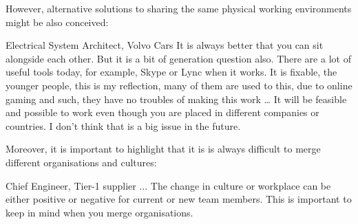 However, alternative solutions to sharing the same physical working environments might be also conceived:

\begin{aquote}{Electrical System Architect, Volvo Cars}
It is always better that you can sit alongside each other. But it is a bit of generation question also. There are a lot of useful tools today, for example, Skype or Lync when it works. It is fixable, the younger people, this is my reflection, many of them are used to this, due to online gaming and such, they have no troubles of making this work … It will be feasible and possible to work even though you are placed in different companies or countries. I don't think that is a big issue in the future.
\end{aquote}

Moreover, it is important to highlight that it is is always difficult to merge different organisations and cultures:

\begin{aquote}{Chief Engineer, Tier-1 supplier}
... The change in culture or workplace can be either positive or negative for current or new team members. This is important to keep in mind when you merge organisations.
\end{aquote}

%
%
%


%
%
%
%

